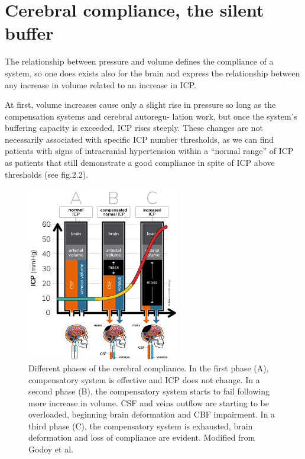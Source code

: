 \section[Cerebral compliance, the silent buffer]{Cerebral compliance, the silent buffer}
The relationship between pressure and volume defines the compliance of a system, so one does exists also for the brain and express the relationship between any increase in volume related to an increase in ICP.

At first, volume increases cause only a slight rise in pressure so long as the compensation systems and cerebral autoregu- lation work, but once the system’s buffering capacity is exceeded, ICP rises steeply.
These changes are not necessarily associated with specific ICP number thresholds, as we can find patients with signs of intracranial hypertension within a “normal range” of ICP as patients that still demonstrate a good compliance in spite of ICP above thresholds (see fig.2.2). \\

\begin{figure}[h]
    \centering
    \includegraphics[width=0.6\textwidth]{pictures/fig2.png}
    \caption{Different phases of the cerebral compliance. In the first phase (A), compensatory system is effective and ICP does not change. In a second phase (B), the compensatory system starts to fail following more increase in volume. CSF and veins outflow are starting to be overloaded, beginning brain deformation and CBF impairment. In a third phase (C), the compensatory system is exhausted, brain deformation and loss of compliance are evident. Modified from Godoy et al.\cite{godoyIntracranialCompartmentalSyndrome2023a}}
\end{figure}

